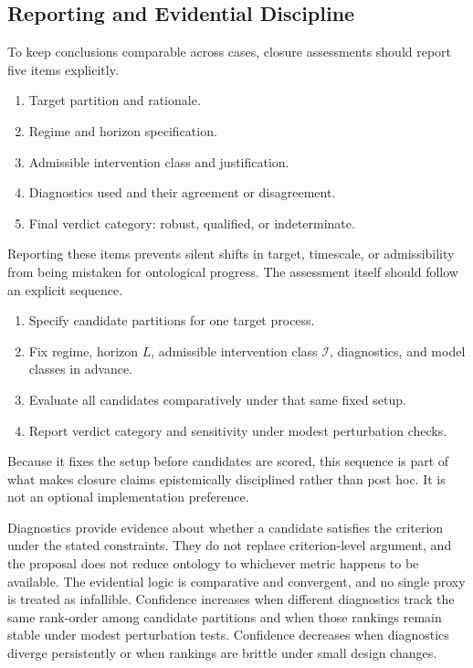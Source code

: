 \subsection{Reporting and Evidential
	Discipline}\label{reporting-and-evidential-discipline}

To keep conclusions comparable across cases, closure assessments should
report five items explicitly.

\begin{enumerate}
	\item
	      Target partition and rationale.
	\item
	      Regime and horizon specification.
	\item
	      Admissible intervention class and justification.
	\item
	      Diagnostics used and their agreement or disagreement.
	\item
	      Final verdict category: robust, qualified, or indeterminate.
\end{enumerate}

Reporting these items prevents silent shifts in target, timescale, or
admissibility from being mistaken for ontological progress. The
assessment itself should follow an explicit sequence.

\begin{enumerate}
	\item
	      Specify candidate partitions for one target process.
	\item
	      Fix regime, horizon \(L\), admissible intervention class
	      \(\mathcal{I}\), diagnostics, and model classes in advance.
	\item
	      Evaluate all candidates comparatively under that same fixed setup.
	\item
	      Report verdict category and sensitivity under modest perturbation
	      checks.
\end{enumerate}

Because it fixes the setup before candidates are scored, this sequence
is part of what makes closure claims epistemically disciplined rather
than post hoc. It is not an optional implementation preference.

Diagnostics provide evidence about whether a candidate satisfies the
criterion under the stated constraints. They do not replace
criterion-level argument, and the proposal does not reduce ontology to
whichever metric happens to be available. The evidential logic is
comparative and convergent, and no single proxy is treated as
infallible. Confidence increases when different diagnostics track the
same rank-order among candidate partitions and when those rankings
remain stable under modest perturbation tests. Confidence decreases when
diagnostics diverge persistently or when rankings are brittle under
small design changes.

